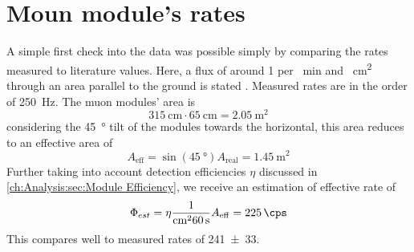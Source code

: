   \section{Moun module's rates}
  \label{ch:Analysis:sec:Muon module's rates}
  A simple first check into the data was possible simply by comparing the rates measured to literature values. Here, a flux of around 1 per \SI{}{\minute} and \SI{}{\square\centi\meter} through an area parallel to the ground is stated \cite{muonFlux}. Measured rates are in the order of \SI{250}{\hertz}. The muon modules' area is
  \begin{equation}
  	\SI{315}{\centi\meter} \cdot \SI{65}{\centi\meter} = \SI{2.05}{\square\meter}
  \end{equation}
  considering the \SI{45}{\degree} tilt of the modules towards the horizontal, this area reduces to an effective area of 
  \begin{equation}
  	A_{\mathrm{eff}} = \sin{\left(\SI{45}{\degree}\right)} A_{\mathrm{real}} = \SI{1.45}{\square\meter}
  \end{equation}
  Further taking into account detection efficiencies $\eta$ discussed in \ref{ch:Analysis:sec:Module Efficiency}, we receive an estimation of effective rate of
  \begin{equation}
  	\Phi_{est} = \eta \frac{1}{\SI{}{\square\centi\meter}\SI{60}{\second}}A_{\mathrm{eff}} = \SI{225}{\cps}
  \end{equation}
  This compares well to measured rates of  \SI{241\pm33}{\cps}.
  
